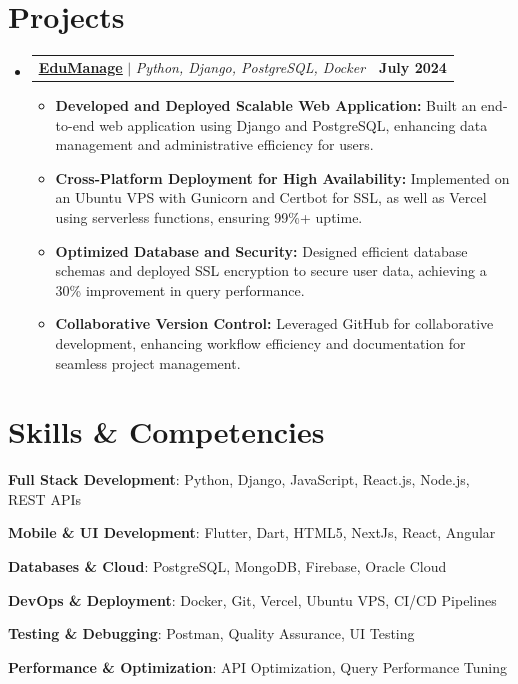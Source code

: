 \documentclass[a4paper,11pt]{article}
\makeatletter
\newcommand{\resumeItem}[1]{
	\item\small{#1 \vspace{-2pt}}
}
\newcommand{\resumeProjectHeading}[2]{\item\begin{tabular*}{0.97\textwidth}{l@{\extracolsep{\fill}}r}\small#1 & \textbf{\small #2} \\\end{tabular*}\vspace{-7pt}
}
\newcommand{\resumeSubHeadingListStart}{\begin{itemize}[leftmargin=0.15in, label={}]}
\newcommand{\resumeSubHeadingListEnd}{\end{itemize}}
\newcommand{\resumeItemListStart}{\begin{itemize}}
\newcommand{\resumeItemListEnd}{\end{itemize}\vspace{-5pt}}
\makeatother
\begin{document}
\section{Projects}
\resumeSubHeadingListStart
\resumeProjectHeading
{\textbf{\href{https://github.com/ajmalbuv/EduManage}{\underline{EduManage}}} $|$ \emph{Python, Django, PostgreSQL, Docker}}{July 2024}
\resumeItemListStart
\resumeItem{\textbf{Developed and Deployed Scalable Web Application:} Built an end-to-end web application using Django and PostgreSQL, enhancing data management and administrative efficiency for users.}
\resumeItem{\textbf{Cross-Platform Deployment for High Availability:} Implemented on an Ubuntu VPS with Gunicorn and Certbot for SSL, as well as Vercel using serverless functions, ensuring 99\%+ uptime.}
\resumeItem{\textbf{Optimized Database and Security:} Designed efficient database schemas and deployed SSL encryption to secure user data, achieving a 30\% improvement in query performance.}
\resumeItem{\textbf{Collaborative Version Control:} Leveraged GitHub for collaborative development, enhancing workflow efficiency and documentation for seamless project management.}
\resumeItemListEnd
\resumeSubHeadingListEnd



\section{Skills \& Competencies}
\begin{itemize}[leftmargin=0.15in, label={}, itemsep=0pt]
    \small{
        \item \textbf{Full Stack Development}: Python, Django, JavaScript, React.js, Node.js, REST APIs
        \item \textbf{Mobile \& UI Development}: Flutter, Dart, HTML5, NextJs, React, Angular
        \item \textbf{Databases \& Cloud}: PostgreSQL, MongoDB, Firebase, Oracle Cloud
        \item \textbf{DevOps \& Deployment}: Docker, Git, Vercel, Ubuntu VPS, CI/CD Pipelines
        \item \textbf{Testing \& Debugging}: Postman, Quality Assurance, UI Testing
        \item \textbf{Performance \& Optimization}: API Optimization, Query Performance Tuning
    }
\end{itemize}
\end{document}
